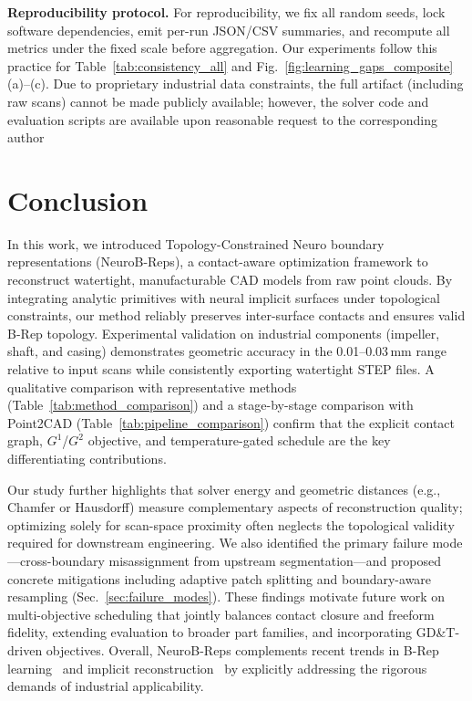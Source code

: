 \documentclass{ieeeaccess}
\begin{document}
\textbf{Reproducibility protocol.} For reproducibility, we fix all random seeds, lock software dependencies, emit per-run JSON/CSV summaries, and recompute all metrics under the fixed scale before aggregation. Our experiments follow this practice for Table~\ref{tab:consistency_all} and Fig.~\ref{fig:learning_gaps_composite}(a)--(c). Due to proprietary industrial data constraints, the full artifact (including raw scans) cannot be made publicly available; however, the solver code and evaluation scripts are available upon reasonable request to the corresponding author


\section{Conclusion}
\label{sec:conclusion}
In this work, we introduced Topology-Constrained Neuro boundary representations (NeuroB-Reps), a contact-aware optimization framework to reconstruct watertight, manufacturable CAD models from raw point clouds. By integrating analytic primitives with neural implicit surfaces under topological constraints, our method reliably preserves inter-surface contacts and ensures valid B-Rep topology. Experimental validation on industrial components (impeller, shaft, and casing) demonstrates geometric accuracy in the 0.01--0.03\,mm range relative to input scans while consistently exporting watertight STEP files. A qualitative comparison with representative methods (Table~\ref{tab:method_comparison}) and a stage-by-stage comparison with Point2CAD (Table~\ref{tab:pipeline_comparison}) confirm that the explicit contact graph, $G^1$/$G^2$ objective, and temperature-gated schedule are the key differentiating contributions.

Our study further highlights that solver energy and geometric distances (e.g., Chamfer or Hausdorff) measure complementary aspects of reconstruction quality; optimizing solely for scan-space proximity often neglects the topological validity required for downstream engineering. We also identified the primary failure mode---cross-boundary misassignment from upstream segmentation---and proposed concrete mitigations including adaptive patch splitting and boundary-aware resampling (Sec.~\ref{sec:failure_modes}). These findings motivate future work on multi-objective scheduling that jointly balances contact closure and freeform fidelity, extending evaluation to broader part families, and incorporating GD\&T-driven objectives. Overall, NeuroB-Reps complements recent trends in B-Rep learning~\cite{b3,b1,b4,b20} and implicit reconstruction~\cite{b5,b6,b17,b21} by explicitly addressing the rigorous demands of industrial applicability.
\end{document}
